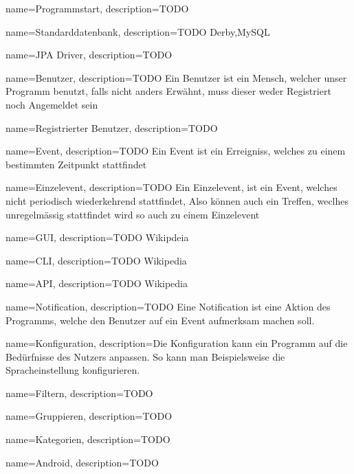 
{
  name=Programmstart,
  description={TODO}
} 

 
{
  name=Standarddatenbank,
  description={TODO Derby,MySQL }
} 

{
  name=JPA Driver,
  description={TODO}
} 

{
  name=Benutzer,
  description={TODO Ein Benutzer ist ein Mensch, welcher unser Programm benutzt, falls nicht anders Erwähnt, muss dieser weder Registriert noch Angemeldet sein}
} 



{
  name=Registrierter Benutzer,
  description={TODO}
} 

{
  name=Event,
  description={TODO Ein Event ist ein Erreigniss, welches zu einem bestimmten Zeitpunkt stattfindet}
} 

{
  name=Einzelevent,
  description={TODO Ein Einzelevent, ist ein Event, welches nicht periodisch wiederkehrend stattfindet, Also können auch ein Treffen, weclhes unregelmässig stattfindet wird so auch zu einem Einzelevent}
} 

{
  name=GUI,
  description={TODO Wikipdeia}
} 

{
  name=CLI,
  description={TODO Wikipedia}
} 

{
  name=API,
  description={TODO Wikipedia}
} 

{
  name=Notification,
  description={TODO Eine Notification ist eine Aktion des Programms, welche den Benutzer auf ein Event aufmerksam machen soll.}
} 

{
  name=Konfiguration,
  description={Die Konfiguration kann ein Programm auf die Bedürfnisse des Nutzers anpassen. So kann man Beispielsweise die Spracheinstellung konfigurieren.}
} 



{
  name=Filtern,
  description={TODO}
} 

{
  name=Gruppieren,
  description={TODO}
} 

{
  name=Kategorien,
  description={TODO }
} 

{
  name=Android,
  description={TODO}
} 

